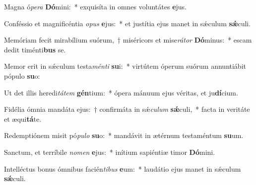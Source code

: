 \item Magna ó\textit{pe}\textit{ra} \textbf{Dó}mini:~* exquisíta in omnes voluntátes \textbf{e}jus.
\item Conféssio et magnificéntia \textit{o}\textit{pus} \textbf{e}jus:~* et justítia ejus manet in sǽculum \textbf{sǽ}culi.
\item Memóriam fecit mirabílium suórum,~† miséricors et mise\textit{rá}\textit{tor} \textbf{Dó}minus:~* escam dedit timénti\textbf{bus} se.
\item Memor erit in sǽculum testa\textit{mén}\textit{ti} \textbf{su}i:~* virtútem óperum suórum annuntiábit pópulo \textbf{su}o:
\item Ut det illis heredi\textit{tá}\textit{tem} \textbf{gén}tium:~* ópera mánuum ejus véritas, et ju\textbf{dí}cium.
\item Fidélia ómnia mandáta ejus:~† confirmáta in sǽ\textit{cu}\textit{lum} \textbf{sǽ}culi,~* facta in veritáte et æqui\textbf{tá}te.
\item Redemptiónem misit pó\textit{pu}\textit{lo} \textbf{su}o:~* mandávit in ætérnum testaméntum \textbf{su}um.
\item Sanctum, et terríbile \textit{no}\textit{men} \textbf{e}jus:~* inítium sapiéntiæ timor \textbf{Dó}mini.
\item Intelléctus bonus ómnibus facién\textit{ti}\textit{bus} \textbf{e}um:~* laudátio ejus manet in sǽculum \textbf{sǽ}culi.
